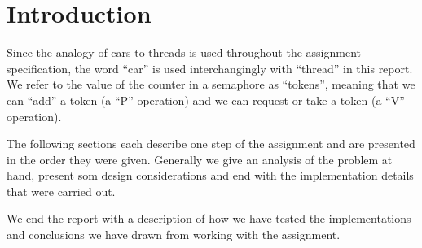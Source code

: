 \section*{Introduction}

Since the analogy of cars to threads is used throughout the assignment specification, the word ``car'' is used interchangingly with ``thread'' in this report. We refer to the value of the counter in a semaphore as ``tokens'', meaning that we can ``add'' a token (a ``P'' operation) and we can request or take a token (a ``V'' operation).

The following sections each describe one step of the assignment and are presented in the order they were given. Generally we give an analysis of the problem at hand, present som design considerations and end with the implementation details that were carried out.

We end the report with a description of how we have tested the implementations and conclusions we have drawn from working with the assignment.

